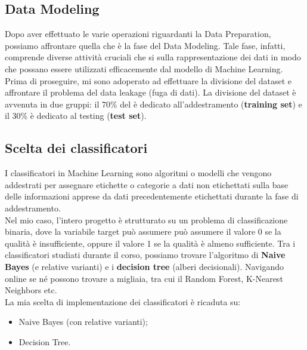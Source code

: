 \documentclass{article}
\begin{document}
\begin{titlepage}
        \section{Data Modeling}
        Dopo aver effettuato le varie operazioni riguardanti la Data Preparation, possiamo affrontare quella che è la fase del Data Modeling. Tale fase, infatti, comprende diverse attività cruciali che si sulla rappresentazione dei dati in modo che possano essere utilizzati efficacemente dal modello di Machine Learning. \\
        Prima di proseguire, mi sono adoperato ad effettuare la divisione del dataset e affrontare il problema del data leakage (fuga di dati). La divisione del dataset è avvenuta in due gruppi: il 70\% del è dedicato all'addestramento (\textbf{training set}) e il 30\% è dedicato al testing (\textbf{test set}).

        \subsection{Scelta dei classificatori}
        I classificatori in Machine Learning sono algoritmi o modelli che vengono addestrati per assegnare etichette o categorie a dati non etichettati sulla base delle informazioni apprese da dati precedentemente etichettati durante la fase di addestramento. \\
        Nel mio caso, l'intero progetto è strutturato su un problema di classificazione binaria, dove la variabile target può assumere può assumere il valore 0 se la qualità è insufficiente, oppure il valore 1 se la qualità è almeno sufficiente. Tra i classificatori studiati durante il corso, possiamo trovare l'algoritmo di \textbf{Naive Bayes} (e relative varianti) e i \textbf{decision tree} (alberi decisionali). Navigando online se né possono trovare a migliaia, tra cui il Random Forest, K-Nearest Neighbors etc. \\
        La mia scelta di implementazione dei classificatori è ricaduta su:
        \begin{itemize}
            \item Naive Bayes (con relative varianti);
            \item Decision Tree.
        \end{itemize}


\end{titlepage}
\end{document}

